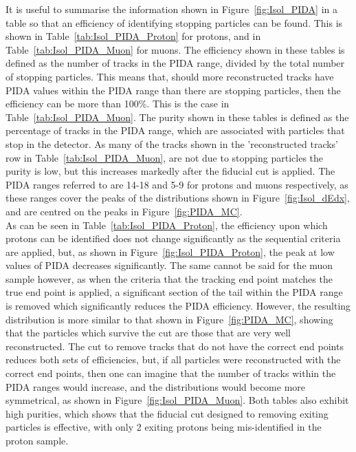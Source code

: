 
It is useful to summarise the information shown in Figure~\ref{fig:Isol_PIDA} in a table so that an efficiency of identifying stopping particles can be found. This is shown in Table~\ref{tab:Isol_PIDA_Proton} for protons, and in Table~\ref{tab:Isol_PIDA_Muon} for muons. The efficiency shown in these tables is defined as the number of tracks in the PIDA range, divided by the total number of stopping particles. This means that, should more reconstructed tracks have PIDA values within the PIDA range than there are stopping particles, then the efficiency can be more than 100\%. This is the case in Table~\ref{tab:Isol_PIDA_Muon}. The purity shown in these tables is defined as the percentage of tracks in the PIDA range, which are associated with particles that stop in the detector. As many of the tracks shown in the 'reconstructed tracks' row in Table~\ref{tab:Isol_PIDA_Muon}, are not due to stopping particles the purity is low, but this increases markedly after the fiducial cut is applied. The PIDA ranges referred to are 14-18 and 5-9 for protons and muons respectively, as these ranges cover the peaks of the distributions shown in Figure~\ref{fig:Isol_dEdx}, and are centred on the peaks in Figure~\ref{fig:PIDA_MC}. \\

As can be seen in Table~\ref{tab:Isol_PIDA_Proton}, the efficiency upon which protons can be identified does not change significantly as the sequential criteria are applied, but, as shown in Figure~\ref{fig:Isol_PIDA_Proton}, the peak at low values of PIDA decreases significantly. The same cannot be said for the muon sample however, as when the criteria that the tracking end point matches the true end point is applied, a significant section of the tail within the PIDA range is removed which significantly reduces the PIDA efficiency. However, the resulting distribution is more similar to that shown in Figure~\ref{fig:PIDA_MC}, showing that the particles which survive the cut are those that are very well reconstructed. The cut to remove tracks that do not have the correct end points reduces both sets of efficiencies, but, if all particles were reconstructed with the correct end points, then one can imagine that the number of tracks within the PIDA ranges would increase, and the distributions would become more symmetrical, as shown in Figure~\ref{fig:Isol_PIDA_Muon}. Both tables also exhibit high purities, which shows that the fiducial cut designed to removing exiting particles is effective, with only 2 exiting protons being mis-identified in the proton sample. \\


